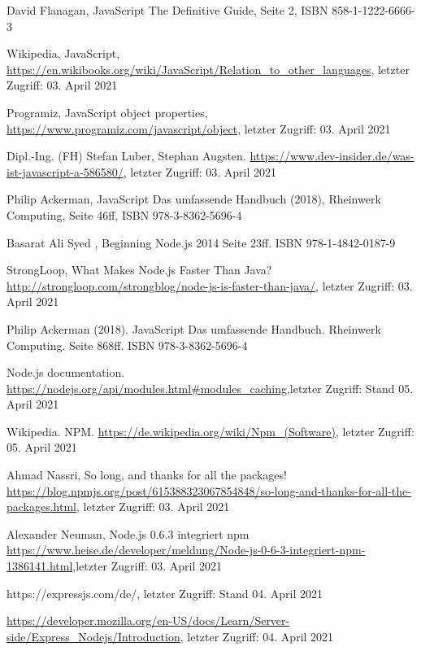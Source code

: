 \documentclass[11pt,a4paper]{article}
\begin{document}
\begin{itemize}
 David Flanagan, JavaScript The Definitive Guide,  Seite 2, ISBN 858-1-1222-6666-3

 Wikipedia, JavaScript, \url{https://en.wikibooks.org/wiki/JavaScript/Relation_to_other_languages}, letzter Zugriff: 03. April 2021

 Programiz, JavaScript object properties, \url{https://www.programiz.com/javascript/object}, letzter Zugriff: 03. April 2021

 Dipl.-Ing. (FH) Stefan Luber, Stephan Augsten. \url{https://www.dev-insider.de/was-ist-javascript-a-586580/}, letzter Zugriff: 03. April 2021

 Philip Ackerman, JavaScript Das umfassende Handbuch (2018), Rheinwerk Computing, Seite 46ff, ISBN 978-3-8362-5696-4

%
%
%
%



 Basarat Ali Syed , Beginning Node.js 2014 Seite 23ff. ISBN 978-1-4842-0187-9

 StrongLoop, What Makes Node.js Faster Than Java? \url{http://strongloop.com/strongblog/node-js-is-faster-than-java/}, letzter Zugriff: 03. April 2021

 Philip Ackerman (2018). JavaScript Das umfassende Handbuch. Rheinwerk Computing. Seite 868ff. ISBN 978-3-8362-5696-4

 Node.js documentation. \url{https://nodejs.org/api/modules.html#modules_caching},letzter Zugriff: Stand 05. April 2021

 Wikipedia. NPM. \url{https://de.wikipedia.org/wiki/Npm_(Software)}, letzter Zugriff: 05. April 2021

 Ahmad Nassri, So long, and thanks for all the packages! \url{https://blog.npmjs.org/post/615388323067854848/so-long-and-thanks-for-all-the-packages.html}, letzter Zugriff: 03. April 2021

 Alexander Neuman, Node.js 0.6.3 integriert npm
\url{https://www.heise.de/developer/meldung/Node-js-0-6-3-integriert-npm-1386141.html},letzter Zugriff: 03. April 2021

 https://expressjs.com/de/, letzter Zugriff: Stand 04. April 2021

 \url{https://developer.mozilla.org/en-US/docs/Learn/Server-side/Express_Nodejs/Introduction}, letzter Zugriff: 04. April 2021


\end{itemize}
\end{document}
